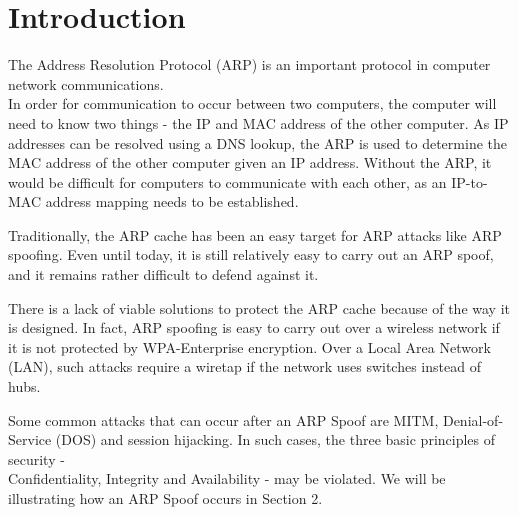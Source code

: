 \documentclass{acm_proc_article-sp}
\begin{document}




\section{Introduction}
The Address Resolution Protocol (ARP) is an important protocol in computer network communications. \\
In order for communication to occur between two computers, the computer will need to know two things - the IP and MAC address of the other computer. As IP addresses can be resolved using a DNS lookup, the ARP is used to determine the MAC address of the other computer given an IP address. Without the ARP, it would be difficult for computers to communicate with each other, as an IP-to-MAC address mapping needs to be established. 

Traditionally, the ARP cache has been an easy target for ARP attacks like ARP spoofing. Even until today, it is still relatively easy to carry out an ARP spoof, and it remains rather difficult to defend against it. 

There is a lack of viable solutions to protect the ARP cache because of the way it is designed. In fact, ARP spoofing is easy to carry out over a wireless network if it is not protected by WPA-Enterprise encryption. Over a Local Area Network (LAN), such attacks require a wiretap if the network uses switches instead of hubs. 

Some common attacks that can occur after an ARP Spoof are MITM, Denial-of-Service (DOS) and session hijacking. 
In such cases, the three basic principles of security -\\ Confidentiality, Integrity and Availability - may be violated. 
We will be illustrating how an ARP Spoof occurs in Section 2. 
\end{document}
